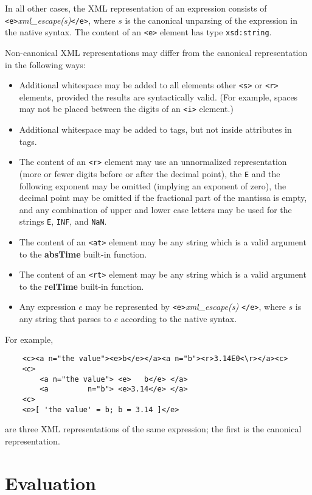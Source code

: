 \documentclass{article}
\begin{document}
In all other cases, the XML representation of an expression consists
of \verb|<e>|\emph{xml\_escape(s)}\verb|</e>|,
where $s$ is the canonical unparsing of the expression in the native syntax.
The content of an \verb/<e>/ element has type \verb/xsd:string/.

Non-canonical XML representations may differ from the canonical representation
in the following ways:
\begin{itemize}
\item Additional whitespace may be added to all elements other \verb/<s>/
or \verb/<r>/ elements, provided the results are syntactically valid.
(For example, spaces may not be placed between the digits of an \verb/<i>/
element.)
\item Additional whitespace may be added to tags, but not inside attributes in
tags.
\item The content of an \verb/<r>/ element may use an unnormalized
representation (more or fewer digits before or after the decimal point),
the \verb/E/ and the following exponent may be omitted (implying an exponent
of zero), the decimal point may be omitted if the fractional part of the
mantissa is empty, and any combination of upper and lower case letters may
be used for the strings \verb/E/, \verb/INF/, and \verb/NaN/.
\item The content of an \verb/<at>/ element may be any string which is a valid
argument to the \textbf{absTime} built-in function.
\item The content of an \verb/<rt>/ element may be any string which is a valid
argument to the \textbf{relTime} built-in function.
\item Any expression $e$ may be represented by
\verb|<e>|\emph{xml\_escape(s)} \verb|</e>|, where $s$ is any string that
parses to $e$ according to the native syntax.
\end{itemize}
For example, 
\begin{verbatim}
    <c><a n="the value"><e>b</e></a><a n="b"><r>3.14E0<\r></a><c>
    <c>
        <a n="the value"> <e>   b</e> </a>
        <a         n="b"> <e>3.14</e> </a>
    <c>
    <e>[ 'the value' = b; b = 3.14 ]</e>
\end{verbatim}
are three XML representations of the same expression; the first is the
canonical representation.

\section{Evaluation}
\label{sec:evaluation}
\end{document}
